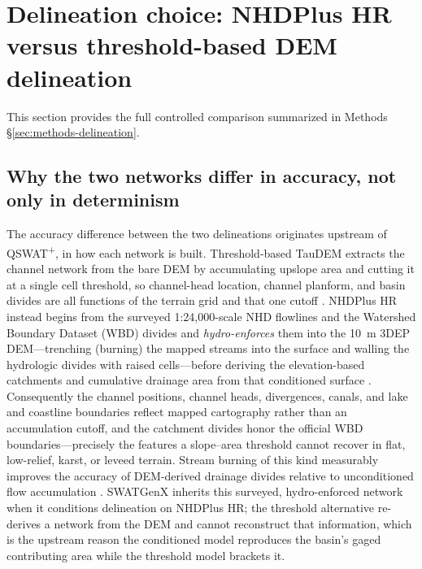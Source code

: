 \section{Delineation choice: NHDPlus HR versus threshold-based DEM delineation}
\label{sec:supp-delineation}

This section provides the full controlled comparison summarized in Methods \S\ref{sec:methods-delineation}.

\subsection{Why the two networks differ in accuracy, not only in determinism}
The accuracy difference between the two delineations originates upstream of QSWAT\textsuperscript{+}, in how each network is built.
Threshold-based TauDEM extracts the channel network from the bare DEM by accumulating upslope area and cutting it at a single cell threshold, so channel-head location, channel planform, and basin divides are all functions of the terrain grid and that one cutoff \citep{Tarboton1997TauDEM, Tarboton1991ChannelNetworks}.
NHDPlus HR instead begins from the surveyed 1:24{,}000-scale NHD flowlines and the Watershed Boundary Dataset (WBD) divides and \emph{hydro-enforces} them into the 10~m 3DEP DEM---trenching (burning) the mapped streams into the surface and walling the hydrologic divides with raised cells---before deriving the elevation-based catchments and cumulative drainage area from that conditioned surface \citep{Moore2019NHDPlusHR, Moore2025NHDPlusHR}.
Consequently the channel positions, channel heads, divergences, canals, and lake and coastline boundaries reflect mapped cartography rather than an accumulation cutoff, and the catchment divides honor the official WBD boundaries---precisely the features a slope--area threshold cannot recover in flat, low-relief, karst, or leveed terrain.
Stream burning of this kind measurably improves the accuracy of DEM-derived drainage divides relative to unconditioned flow accumulation \citep{Lindsay2016StreamBurning}.
SWATGenX inherits this surveyed, hydro-enforced network when it conditions delineation on NHDPlus HR; the threshold alternative re-derives a network from the DEM and cannot reconstruct that information, which is the upstream reason the conditioned model reproduces the basin's gaged contributing area while the threshold model brackets it.

